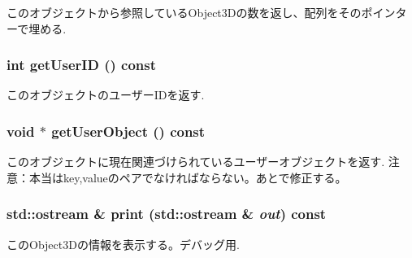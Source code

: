このオブジェクトから参照しているObject3Dの数を返し、配列をそのポインターで埋める. \hypertarget{classm3g_1_1Object3D_b8d9067364251d0208fcdc502d394e2c}{
\subsubsection[{getUserID}]{\setlength{\rightskip}{0pt plus 5cm}int getUserID () const}}
\label{classm3g_1_1Object3D_b8d9067364251d0208fcdc502d394e2c}


このオブジェクトのユーザーIDを返す. \hypertarget{classm3g_1_1Object3D_a9b8541216c1fa7792617218a5fb6672}{
\subsubsection[{getUserObject}]{\setlength{\rightskip}{0pt plus 5cm}void $\ast$ getUserObject () const}}
\label{classm3g_1_1Object3D_a9b8541216c1fa7792617218a5fb6672}


このオブジェクトに現在関連づけられているユーザーオブジェクトを返す. 注意：本当はkey,valueのペアでなければならない。あとで修正する。 \hypertarget{classm3g_1_1Object3D_6fea17fa1532df3794f8cb39cb4f911f}{
\subsubsection[{print}]{\setlength{\rightskip}{0pt plus 5cm}std::ostream \& print (std::ostream \& {\em out}) const}}
\label{classm3g_1_1Object3D_6fea17fa1532df3794f8cb39cb4f911f}


このObject3Dの情報を表示する。デバッグ用. 

